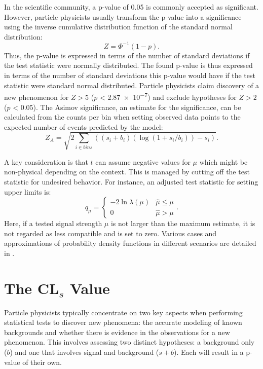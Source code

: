 In the scientific community, a p-value of 0.05 is commonly accepted as significant. However, particle physicists usually transform the p-value into a significance using the inverse cumulative distribution function of the standard normal distribution:
\begin{equation}
    Z = \Phi^{-1}(1 - p).
\end{equation}
Thus, the p-value is expressed in terms of the number of standard deviations if the test statistic were normally distributed.
The found p-value is thus expressed in terms of the number of standard deviations this p-value would have if the test statistic were standard normal distributed. Particle physicists claim discovery of a new phenomenon for $Z>5$ ($p$ < \qty{2.87e-7}{}) and exclude hypotheses for $Z>2$ ($p$ < 0.05). The Asimov significance, an estimate for the significance, can be calculated from the counts per bin when setting observed data points to the expected number of events predicted by the model:
\begin{equation}\label{eq:asimov-significance}
    Z_A = \sqrt{2\sum_{i\in bins}((s_i + b_i)(\log{(1 + s_i / b_i)}) - s_i)}.
\end{equation}


A key consideration is that $t$ can assume negative values for $\mu$ which might be non-physical depending on the context. This is managed by cutting off the test statistic for undesired behavior. For instance, an adjusted test statistic for setting upper limits is:
\begin{equation}
    q_\mu=
    \begin{cases}
        -2\ln \lambda(\mu) & \hat{\mu}\leq\mu \\
        0                  & \hat{\mu}> \mu
    \end{cases}.
\end{equation}
Here, if a tested signal strength $\mu$ is not larger than the maximum estimate, it is not regarded as less compatible and is set to zero. Various cases and approximations of probability density functions in different scenarios are detailed in \citep{cowan2011asymptotic}.

\section{The CL$_s$ Value}\label{sec:cls}
Particle physicists typically concentrate on two key aspects when performing statistical tests to discover new phenomena: the accurate modeling of known backgrounds and whether there is evidence in the observations for a new phenomenon. This involves assessing two distinct hypotheses: a background only ($b$) and one that involves signal and background ($s+b$). Each will result in a p-value of their own.

